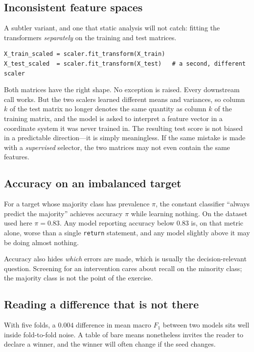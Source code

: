 \documentclass[11pt,a4paper]{article}
\begin{document}
\subsection{Inconsistent feature spaces}
\label{sec:spaces}

A subtler variant, and one that static analysis will not catch: fitting the
transformers \emph{separately} on the training and test matrices.

\begin{lstlisting}
X_train_scaled = scaler.fit_transform(X_train)
X_test_scaled  = scaler.fit_transform(X_test)   # a second, different scaler
\end{lstlisting}

Both matrices have the right shape. No exception is raised. Every downstream
call works. But the two scalers learned different means and variances, so
column $k$ of the test matrix no longer denotes the same quantity as column $k$
of the training matrix, and the model is asked to interpret a feature vector in
a coordinate system it was never trained in. The resulting test score is not
biased in a predictable direction---it is simply meaningless. If the same
mistake is made with a \emph{supervised} selector, the two matrices may not
even contain the same features.

\subsection{Accuracy on an imbalanced target}
\label{sec:imbalance}

For a target whose majority class has prevalence $\pi$, the constant classifier
``always predict the majority'' achieves accuracy $\pi$ while learning nothing.
On the dataset used here $\pi = 0.83$. Any model reporting accuracy below
$0.83$ is, on that metric alone, worse than a single \texttt{return} statement,
and any model slightly above it may be doing almost nothing.

Accuracy also hides \emph{which} errors are made, which is usually the
decision-relevant question. Screening for an intervention cares about recall on
the minority class; the majority class is not the point of the exercise.

\subsection{Reading a difference that is not there}

With five folds, a $0.004$ difference in mean macro $F_1$ between two models
sits well inside fold-to-fold noise. A table of bare means nonetheless invites
the reader to declare a winner, and the winner will often change if the seed
changes.
\end{document}
